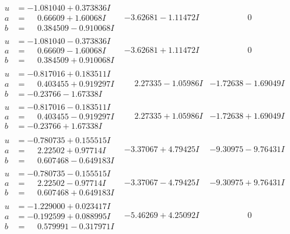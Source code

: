 \documentclass[1p]{elsarticle_modified}
\theoremstyle{definition}
\begin{document}
$$\begin{array}{c|c|c}
\begin{aligned}
u &= -1.081040 + 0.373836 I \\
a &= \phantom{-}0.66609 + 1.60068 I \\
b &= \phantom{-}0.384509 - 0.910068 I\end{aligned}
 & -3.62681 - 1.11472 I & \phantom{-0.000000 } 0 \\ \hline\begin{aligned}
u &= -1.081040 - 0.373836 I \\
a &= \phantom{-}0.66609 - 1.60068 I \\
b &= \phantom{-}0.384509 + 0.910068 I\end{aligned}
 & -3.62681 + 1.11472 I & \phantom{-0.000000 } 0 \\ \hline\begin{aligned}
u &= -0.817016 + 0.183511 I \\
a &= \phantom{-}0.403455 + 0.919297 I \\
b &= -0.23766 - 1.67338 I\end{aligned}
 & \phantom{-}2.27335 - 1.05986 I & -1.72638 - 1.69049 I \\ \hline\begin{aligned}
u &= -0.817016 - 0.183511 I \\
a &= \phantom{-}0.403455 - 0.919297 I \\
b &= -0.23766 + 1.67338 I\end{aligned}
 & \phantom{-}2.27335 + 1.05986 I & -1.72638 + 1.69049 I \\ \hline\begin{aligned}
u &= -0.780735 + 0.155515 I \\
a &= \phantom{-}2.22502 + 0.97714 I \\
b &= \phantom{-}0.607468 - 0.649183 I\end{aligned}
 & -3.37067 + 4.79425 I & -9.30975 - 9.76431 I \\ \hline\begin{aligned}
u &= -0.780735 - 0.155515 I \\
a &= \phantom{-}2.22502 - 0.97714 I \\
b &= \phantom{-}0.607468 + 0.649183 I\end{aligned}
 & -3.37067 - 4.79425 I & -9.30975 + 9.76431 I \\ \hline\begin{aligned}
u &= -1.229000 + 0.023417 I \\
a &= -0.192599 + 0.088995 I \\
b &= \phantom{-}0.579991 - 0.317971 I\end{aligned}
 & -5.46269 + 4.25092 I & \phantom{-0.000000 } 0 \\ \hline\begin{aligned}

\end{aligned}
\end{array}$$
\end{document}
